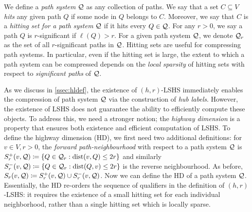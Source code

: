 \documentclass[opre,nonblindrev]{informs3} %
\begin{document}
We define a \emph{path system} $\calQ$ as any collection of paths.
We say that a set $C\subseteq V$ \emph{hits} any given path $Q$ if some node in $Q$ belongs to $C$. Moreover, we say that $C$ is a \emph{hitting set for a path system} $\calQ$ if it hits every $Q\in\calQ$. 
For any $r>0$, we say a path $Q$ is $r$-significant if $\ell(Q)>r$. 
For a given path system $\calQ$, we denote $\calQ_r$ as the set of all $r$-significant paths in $\calQ$.
Hitting sets are useful for compressing path systems. 
In particular, even if the hitting set is large, the extent to which a path system can be compressed depends on the \emph{local sparsity} of hitting sets with respect to \emph{significant paths} of $\calQ$.



As we discuss in \cref{ssec:hldef}, the existence of $(h,r)$-LSHS immediately enables the compression of path system $\calQ$ via the construction of \emph{hub labels}. 
However, the existence of LSHS does not guarantee the ability to efficiently compute these objects. 
To address this, we need a stronger notion; the \emph{highway dimension} is a property that ensures both existence and efficient computation of LSHS.
To define the highway dimension (HD), we first need two additional definitions:
for $v\in V, r>0$, the \emph{forward path-neighbourhood} with respect to a path system $\calQ$ is $
S_r^+(v,\calQ) \defeq\crl*{Q\in\calQ_r: \dist(v,Q)\leq 2r}$ and similarly $S_r^-(v,\calQ) \defeq\crl*{Q\in\calQ_r: \dist(Q,v)\leq 2r}$ is the reverse neighbourhood.
As before, $S_r(v,\calQ) \defeq S_r^+(v,\calQ)\cup S_r^-(v,\calQ)$. 
Now we can define the HD of a path system $\calQ$. 
Essentially, the HD re-orders the sequence of qualifiers in the definition of $(h,r)$-LSHS: it requires the existence of a small hitting set for each individual neighborhood, rather than a single hitting set which is locally sparse. 
\end{document}

